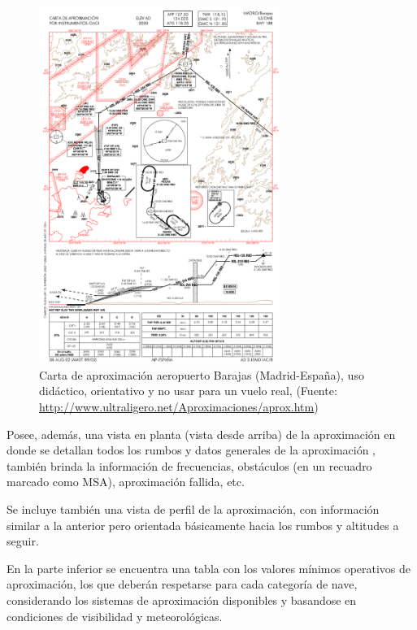\begin{figure}[!htb]
    \centering
    \includegraphics[width=0.70\textwidth]{08.navegadores/08.Imagenes/barajas18r_cropped.pdf}
    \caption{Carta de aproximaci\'on aeropuerto Barajas (Madrid-Espa\~na), uso
    did\'actico, orientativo y no usar para un vuelo real, (Fuente: \url{http://www.ultraligero.net/Aproximaciones/aprox.htm})}
    \label{fig:carta.aproximacion.instrumental.aeropuerto.barajas}
\end{figure}

Posee, adem\'as, una vista en planta (vista desde arriba) de la aproximaci\'on en
donde se detallan todos los rumbos y datos generales de la aproximaci\'on ,
tambi\'en brinda la informaci\'on de frecuencias, obst\'aculos (en un recuadro
marcado como MSA), aproximaci\'on fallida, etc.

Se incluye tambi\'en una vista de perfil de la aproximaci\'on, con informaci\'on
similar a la anterior pero orientada b\'asicamente hacia los rumbos y altitudes
a seguir.

En la parte inferior se encuentra una tabla con los valores m\'inimos operativos
de aproximaci\'on, los que deber\'an respetarse para cada categor\'ia de nave,
considerando los sistemas de aproximaci\'on disponibles y basandose en
condiciones de visibilidad y meteorol\'ogicas.

